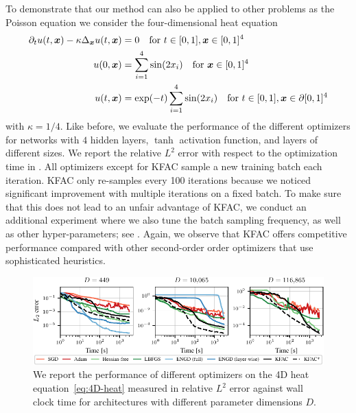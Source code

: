 To demonstrate that our method can also be applied to other problems as the Poisson equation we consider the four-dimensional heat equation
\begin{align}\label{eq:4D-heat}
     \partial_t u(t,{\bm{x}})-\kappa\Delta_{\bm{x}} u(t,{\bm{x}}) & = 0 \quad \text{for } t\in[0,1], {\bm{x}}\in [0,1]^{4} \\
    u(0,{\bm{x}}) & = \sum_{i=1}^{4} \sin(2 x_i) \quad \text{for }
     {\bm{x}}\in [0,1]^{4}
     \\
     u(t,{\bm{x}}) & = \exp(-t) \sum_{i=1}^{4} \sin(2 x_i) \quad \text{for } t\in[0,1], {\bm{x}}\in\partial[0,1]^{4}
\end{align}
with $\kappa = 1/4$. Like before, we evaluate the performance of the different optimizers for networks with $4$ hidden layers, $\tanh$ activation function, and layers of different sizes.
We report the relative $L^2$ error with respect to the optimization time in .
All optimizers except for KFAC sample a new training batch each iteration.
KFAC only re-samples every 100 iterations because we noticed  significant improvement with multiple iterations on a fixed batch.
To make sure that this does not lead to an unfair advantage of KFAC, we conduct an additional experiment where we also tune the batch sampling frequency, as well as other hyper-parameters; see .
Again, we observe that KFAC offers competitive performance compared with other second-order order optimizers that use sophisticated heuristics. 
\begin{figure}
    \centering
    \includegraphics{../kfac_pinns_exp/exp30_heat4d_groupplot/l2_error_over_time.pdf}
    \caption{We report the performance of different optimizers on the 4D heat equation~\eqref{eq:4D-heat} measured in relative $L^2$ error against wall clock time for architectures with different parameter dimensions $D$.}
    \label{fig:4D-heat}
\end{figure}


